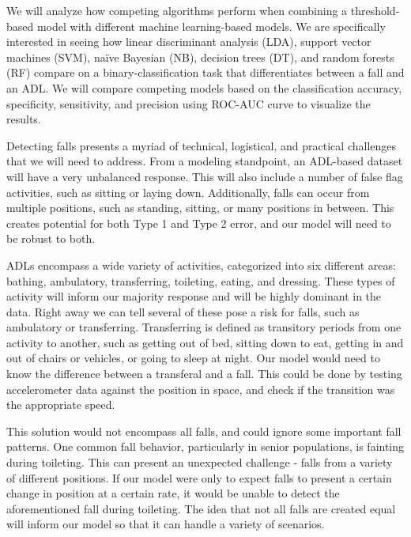 \documentclass{llncs}
\begin{document}

	We will analyze how competing algorithms perform when combining a threshold-based model with different machine learning-based models. We are specifically interested in seeing how linear discriminant analysis (LDA), support vector machines (SVM), naïve Bayesian (NB), decision trees (DT), and random forests (RF) compare on a binary-classification task that differentiates between a fall and an ADL. We will compare competing models based on the classification accuracy, specificity, sensitivity, and precision using ROC-AUC curve to visualize the results. 

	Detecting falls presents a myriad of technical, logistical, and practical challenges that we will need to address. From a modeling standpoint, an ADL-based dataset will have a very unbalanced response. This will also include a number of false flag activities, such as sitting or laying down. Additionally, falls can occur from multiple positions, such as standing, sitting, or many positions in between. This creates potential for both Type 1 and Type 2 error, and our model will need to be robust to both.
    
    ADLs encompass a wide variety of activities, categorized into six different areas: bathing, ambulatory, transferring, toileting, eating, and dressing. These types of activity will inform our majority response and will be highly dominant in the data. Right away we can tell several of these pose a risk for falls, such as ambulatory or transferring. Transferring is defined as transitory periods from one activity to another, such as getting out of bed, sitting down to eat, getting in and out of chairs or vehicles, or going to sleep at night. Our model would need to know the difference between a transferal and a fall. This could be done by testing accelerometer data against the position in space, and check if the transition was the appropriate speed. 
    
    This solution would not encompass all falls, and could ignore some important fall patterns. One common fall behavior, particularly in senior populations, is fainting during toileting. This can present an unexpected challenge - falls from a variety of different positions. If our model were only to expect falls to present a certain change in position at a certain rate, it would be unable to detect the aforementioned fall during toileting. The idea that not all falls are created equal will inform our model so that it can handle a variety of scenarios.
    
\end{document}
